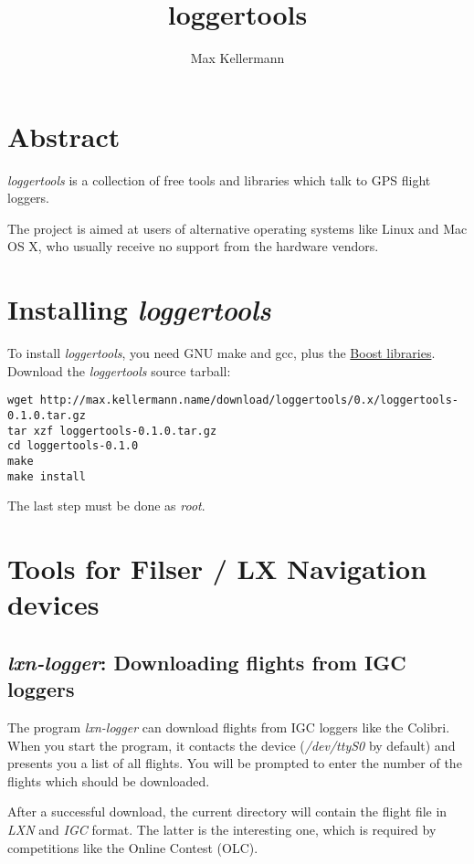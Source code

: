 \documentclass{article}
\title{loggertools}
\author{Max Kellermann}
\begin{document}
\maketitle
\tableofcontents


\section{Abstract}

{\em loggertools} is a collection of free tools and libraries which
talk to GPS flight loggers.

The project is aimed at users of alternative operating systems like
Linux and Mac OS X, who usually receive no support from the hardware
vendors.


\section{Installing {\em loggertools}}

To install {\em loggertools}, you need GNU make and gcc, plus the
\href{http://www.boost.org/}{Boost libraries}.  Download the {\em
loggertools} source tarball:

\begin{verbatim}
wget http://max.kellermann.name/download/loggertools/0.x/loggertools-0.1.0.tar.gz
tar xzf loggertools-0.1.0.tar.gz
cd loggertools-0.1.0
make
make install
\end{verbatim}

The last step must be done as {\em root}.


\section{Tools for Filser / LX Navigation devices}

\subsection{{\em lxn-logger}: Downloading flights from IGC loggers}

The program {\em lxn-logger} can download flights from IGC loggers
like the Colibri.  When you start the program, it contacts the device
({\em /dev/ttyS0} by default) and presents you a list of all flights.
You will be prompted to enter the number of the flights which should
be downloaded.

After a successful download, the current directory will contain the
flight file in {\em LXN} and {\em IGC} format.  The latter is the
interesting one, which is required by competitions like the Online
Contest (OLC).
\end{document}
